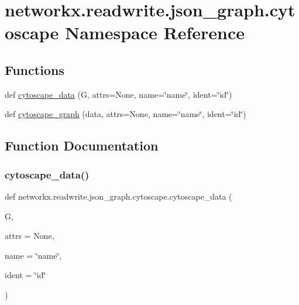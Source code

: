 \hypertarget{namespacenetworkx_1_1readwrite_1_1json__graph_1_1cytoscape}{}\section{networkx.\+readwrite.\+json\+\_\+graph.\+cytoscape Namespace Reference}
\label{namespacenetworkx_1_1readwrite_1_1json__graph_1_1cytoscape}
\subsection*{Functions}
\begin{DoxyCompactItemize}
\item 
def \hyperlink{namespacenetworkx_1_1readwrite_1_1json__graph_1_1cytoscape_a0cf8bd87b601b805fed94f85daa21ddb}{cytoscape\+\_\+data} (G, attrs=None, name=\char`\"{}name\char`\"{}, ident=\char`\"{}id\char`\"{})
\item 
def \hyperlink{namespacenetworkx_1_1readwrite_1_1json__graph_1_1cytoscape_a53e0da9b4289a61f98c229aa3fa6deb6}{cytoscape\+\_\+graph} (data, attrs=None, name=\char`\"{}name\char`\"{}, ident=\char`\"{}id\char`\"{})
\end{DoxyCompactItemize}


\subsection{Function Documentation}
\mbox{\label{namespacenetworkx_1_1readwrite_1_1json__graph_1_1cytoscape_a0cf8bd87b601b805fed94f85daa21ddb}} 
\subsubsection{\texorpdfstring{cytoscape\+\_\+data()}{cytoscape\_data()}}
{\footnotesize\ttfamily def networkx.\+readwrite.\+json\+\_\+graph.\+cytoscape.\+cytoscape\+\_\+data (\begin{DoxyParamCaption}\item[{}]{G,  }\item[{}]{attrs = {\ttfamily None},  }\item[{}]{name = {\ttfamily \char`\"{}name\char`\"{}},  }\item[{}]{ident = {\ttfamily \char`\"{}id\char`\"{}} }\end{DoxyParamCaption})}

